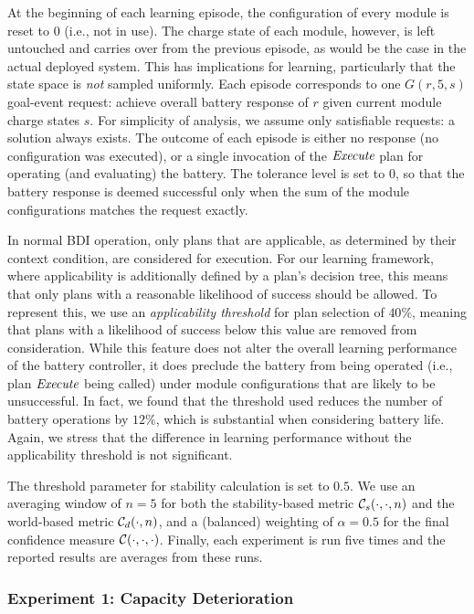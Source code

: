At the beginning of each learning episode, the configuration of every module is reset to $0$ (i.e., not in use). 
The charge state of each module, however, is left untouched and carries over from the previous episode, as would be the case in the actual deployed system. This has implications for learning, particularly that the state space is \emph{not} sampled uniformly. %
Each episode corresponds to one $G(r,5,s)$ goal-event request: achieve overall battery response of $r$ given current module charge states $s$.  For simplicity of analysis, we assume only satisfiable requests: a solution always exists. The outcome of each episode is either no response (no configuration was executed), or a single invocation of the $\operatorname{\textit{Execute}}$ plan for operating (and evaluating) the battery.  The tolerance level is set to $0$, so that the battery response is deemed successful only when the sum of the module configurations matches the request exactly.

In normal BDI operation, only plans that are applicable, as determined by their context condition, are considered for execution. For our learning framework, where applicability is additionally defined by a plan's decision tree, this means that only plans with a reasonable likelihood of success should be allowed. To represent this, we use 
an \emph{applicability threshold} for plan selection of $40\%$, meaning that plans with a likelihood of success below this value are removed from consideration. While this feature does not alter the overall learning performance of the battery controller, it does preclude the battery from being operated (i.e., plan $\operatorname{\textit{Execute}}$ being called) under module configurations that are likely to be unsuccessful. In fact, we found that the threshold used reduces the number of battery operations by $12\%$, which is substantial when considering battery life. Again, we stress that the difference in learning performance without the applicability threshold is not significant.


The threshold parameter for stability calculation is set to $0.5$. We use an averaging window of $n=5$ for both the stability-based metric ${\mathcal{C}}_s(\cdot,\cdot,n)$ and the world-based metric ${\mathcal{C}}_d(\cdot,n)$, and a (balanced) weighting of $\alpha=0.5$ for the final confidence measure ${\mathcal{C}}(\cdot,\cdot,\cdot)$.
Finally, each experiment is run five times and the reported results are averages from these runs.



\subsubsection{Experiment 1: Capacity Deterioration}

